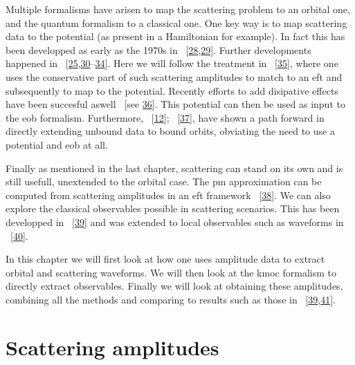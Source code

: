 \documentclass[
  10pt,
  a4paper,
  DIV=11,
  numbers=noendperiod,
  twoside]{scrreprt}
\DeclareRobustCommand{\[}{\begin{equation}}
\DeclareRobustCommand{\]}{\end{equation}}
\begin{document}
Multiple formalisms have arisen to map the scattering problem to an
orbital one, and the quantum formalism to a classical one. One key way
is to map scattering data to the potential (as present in a Hamiltonian
for example). In fact this has been developped as early as the 1970s in
~{[}\protect\hyperlink{ref-Hiida:1972xs}{28},\protect\hyperlink{ref-Iwasaki:1971vb}{29}{]}.
Further developments happened in
~{[}\protect\hyperlink{ref-Damour:2016gwp}{25},\protect\hyperlink{ref-Neill:2013wsa}{30}--\protect\hyperlink{ref-Guevara:2017csg}{34}{]}.
Here we will follow the treatment in
~{[}\protect\hyperlink{ref-Cheung:2018wkq}{35}{]}, where one uses the
conservative part of such scattering amplitudes to match to an \gls{eft}
and subsequently to map to the potential. Recently efforts to add
disipative effects have been succesful aswell ~{[}see
\protect\hyperlink{ref-Kalin:2022hph}{36}{]}. This potential can then be
used as input to the \gls{eob} formalism. Furthermore,
~{[}\protect\hyperlink{ref-Kalin:2019rwq}{12}{]};
~{[}\protect\hyperlink{ref-Kalin:2019inp}{37}{]}, have shown a path
forward in directly extending unbound data to bound orbits, obviating
the need to use a potential and \gls{eob} at all.

Finally as mentioned in the last chapter, scattering can stand on its
own and is still usefull, unextended to the orbital case. The \gls{pm}
approximation can be computed from scattering amplitudes in an \gls{eft}
framework ~{[}\protect\hyperlink{ref-Kalin:2020mvi}{38}{]}. We can also
explore the classical observables possible in scattering scenarios. This
has been developped in
~{[}\protect\hyperlink{ref-Kosower:2018adc}{39}{]} and was extended to
local observables such as waveforms in
~{[}\protect\hyperlink{ref-Cristofoli:2021vyo}{40}{]}.

In this chapter we will first look at how one uses amplitude data to
extract orbital and scattering waveforms. We will then look at the
\gls{kmoc} formalism to directly extract observables. Finally we will
look at obtaining these amplitudes, combining all the methods and
comparing to results such as those in
~{[}\protect\hyperlink{ref-Kosower:2018adc}{39},\protect\hyperlink{ref-Bern:2021xze}{41}{]}.

\hypertarget{sec-scatamp}{%
\section{Scattering amplitudes}\label{sec-scatamp}}
\end{document}
